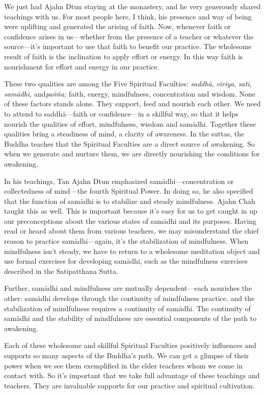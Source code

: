 
We just had Ajahn Dtun staying at the monastery, and he very generously 
shared teachings with us. For most people here, I think, his presence 
and way of being were uplifting and generated the arising of faith. 
Now, whenever faith or confidence arises in us---whether from the 
presence of a teacher or whatever the source---it's important to use 
that faith to benefit our practice. The wholesome result of faith is 
the inclination to apply effort or energy. In this way faith is 
nourishment for effort and energy in our practice.

These two qualities are among the Five Spiritual Faculties: 
\emph{saddhā}, \emph{viriya}, \emph{sati}, \emph{samādhi,} 
and\emph{pañña;} faith, energy, mindfulness, concentration and 
wisdom. None of these factors stands alone. They support, feed and 
nourish each other. We need to attend to saddhā---faith or 
confidence---in a skillful way, so that it helps nourish the qualities 
of effort, mindfulness, wisdom and samādhi. Together these qualities 
bring a steadiness of mind, a clarity of awareness. In the suttas, the 
Buddha teaches that the Spiritual Faculties are a direct source of 
awakening. So when we generate and nurture them, we are directly 
nourishing the conditions for awakening.

In his teachings, Tan Ajahn Dtun emphasized samādhi---concentration or 
collectedness of mind---the fourth Spiritual Power. In doing so, he 
also specified that the function of samādhi is to stabilize and steady 
mindfulness. Ajahn Chah taught this as well. This is important because 
it's easy for us to get caught in up our preconceptions about the 
various states of samādhi and its purposes. Having read or heard about 
them from various teachers, we may misunderstand the chief reason to 
practice samādhi---again, it's the stabilization of mindfulness. When 
mindfulness isn't steady, we have to return to a wholesome meditation 
object and use formal exercises for developing samādhi, such as the 
mindfulness exercises described in the Satipatthana Sutta.

Further, samādhi and mindfulness are mutually dependent---each 
nourishes the other: samādhi develops through the continuity of 
mindfulness practice, and the stabilization of mindfulness requires a 
continuity of samādhi. The continuity of samādhi and the stability of 
mindfulness are essential components of the path to awakening.

Each of these wholesome and skillful Spiritual Faculties positively 
influences and supports so many aspects of the Buddha's path. We can 
get a glimpse of their power when we see them exemplified in the elder 
teachers whom we come in contact with. So it's important that we take 
full advantage of these teachings and teachers. They are invaluable 
supports for our practice and spiritual cultivation.

